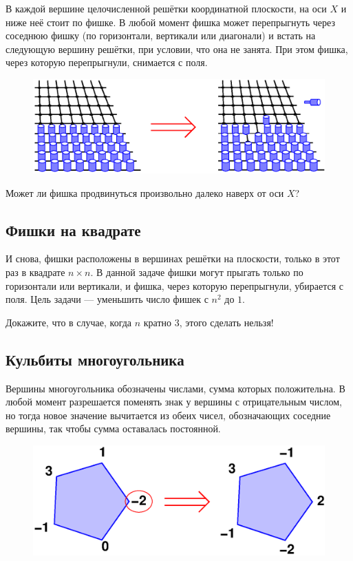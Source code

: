 В каждой вершине целочисленной решётки координатной плоскости, на оси $X$ и ниже неё стоит по фишке.
В любой момент фишка может перепрыгнуть через соседнюю фишку (по горизонтали, вертикали или диагонали) и встать на следующую вершину решётки, при условии, что она не занята.
При этом фишка, через которую перепрыгнули, снимается с поля.

\begin{figure}[h!]
\centering
\includegraphics[scale=0.6]{Figs/Algorithms/pegs}
\end{figure}

Может ли фишка продвинуться произвольно далеко наверх от оси $X$?

\subsection*{Фишки на квадрате}%

И снова, фишки расположены в вершинах решётки на плоскости, только в этот раз в квадрате $n\times n$.
В данной задаче фишки могут прыгать только по горизонтали или вертикали, и фишка, через которую перепрыгнули, убирается с поля.
Цель задачи --- уменьшить число фишек с $n^2$ до $1$.

Докажите, что в случае, когда $n$ кратно $3$, этого сделать нельзя!

\subsection*{Кульбиты многоугольника}%

Вершины многоугольника обозначены числами, сумма которых положительна.
В любой момент разрешается поменять знак у вершины с отрицательным числом, но тогда новое значение вычитается из обеих чисел, обозначающих соседние вершины, так чтобы сумма оставалась постоянной.

\begin{figure}[h!]
\centering
\includegraphics[scale=0.6]{Figs/Algorithms/pent}
\end{figure}

